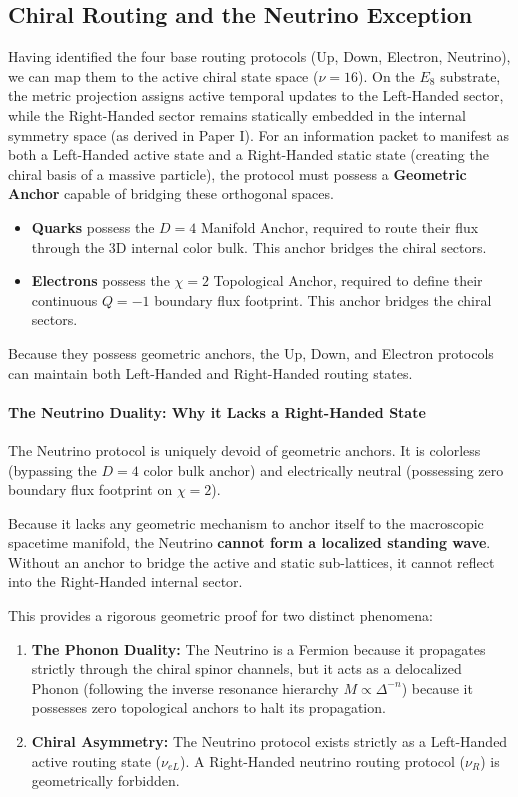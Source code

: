 \subsection{Chiral Routing and the Neutrino Exception}

Having identified the four base routing protocols (Up, Down, Electron, Neutrino), we can map them to the active chiral state space ($\nu=16$). On the $E_8$ substrate, the metric projection assigns active temporal updates to the Left-Handed sector, while the Right-Handed sector remains statically embedded in the internal symmetry space (as derived in Paper I). For an information packet to manifest as both a Left-Handed active state and a Right-Handed static state (creating the chiral basis of a massive particle), the protocol must possess a \textbf{Geometric Anchor} capable of bridging these orthogonal spaces. 

\begin{itemize}
    \item \textbf{Quarks} possess the $D=4$ Manifold Anchor, required to route their flux through the 3D internal color bulk. This anchor bridges the chiral sectors.
    \item \textbf{Electrons} possess the $\chi=2$ Topological Anchor, required to define their continuous $Q=-1$ boundary flux footprint. This anchor bridges the chiral sectors.
\end{itemize}

Because they possess geometric anchors, the Up, Down, and Electron protocols can maintain both Left-Handed and Right-Handed routing states. 

\paragraph{The Neutrino Duality: Why it Lacks a Right-Handed State}

The Neutrino protocol is uniquely devoid of geometric anchors. It is colorless (bypassing the $D=4$ color bulk anchor) and electrically neutral (possessing zero boundary flux footprint on $\chi=2$). 

Because it lacks any geometric mechanism to anchor itself to the macroscopic spacetime manifold, the Neutrino \textbf{cannot form a localized standing wave}. Without an anchor to bridge the active and static sub-lattices, it cannot reflect into the Right-Handed internal sector. 

This provides a rigorous geometric proof for two distinct phenomena:
\begin{enumerate}
    \item \textbf{The Phonon Duality:} The Neutrino is a Fermion because it propagates strictly through the chiral spinor channels, but it acts as a delocalized Phonon (following the inverse resonance hierarchy $M \propto \Delta^{-n}$) because it possesses zero topological anchors to halt its propagation.
    \item \textbf{Chiral Asymmetry:} The Neutrino protocol exists strictly as a Left-Handed active routing state ($\nu_{eL}$). A Right-Handed neutrino routing protocol ($\nu_R$) is geometrically forbidden. 
\end{enumerate}

